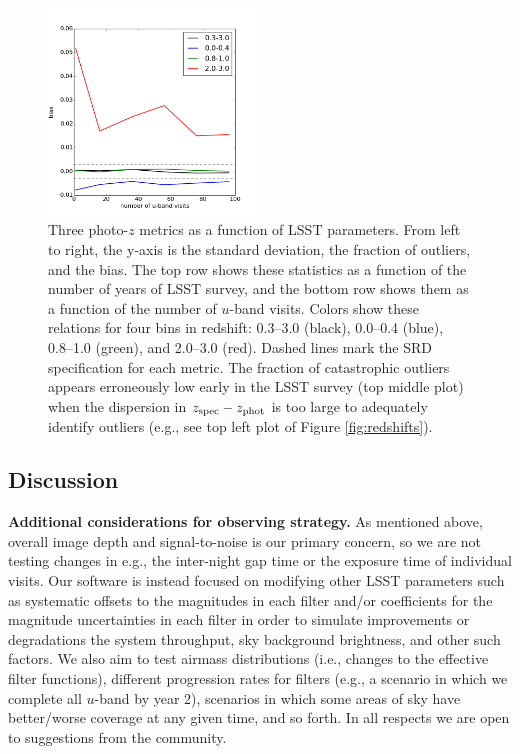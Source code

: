 \begin{figure}[h]
\begin{center}
\includegraphics[width=5.5cm]{figs/photoz/uvisits_bias.png}
\caption{Three photo-$z$ metrics as a function of LSST parameters. From
left to right, the y-axis is the standard deviation, the fraction of
outliers, and the bias. The top row shows these statistics as a function
of the number of years of LSST survey, and the bottom row shows them as
a function of the number of $u$-band visits. Colors show these relations
for four bins in redshift: 0.3--3.0 (black), 0.0--0.4 (blue), 0.8--1.0
(green), and 2.0--3.0 (red). Dashed lines mark the SRD specification for
each metric. The fraction of catastrophic outliers appears erroneously
low early in the LSST survey (top middle plot) when the dispersion in
$z_{\rm spec}-z_{\rm phot}$ is too large to adequately identify outliers
(e.g., see top left plot of Figure \ref{fig:redshifts}).
\label{fig:metrics}}
\end{center}
\end{figure}


\subsection{Discussion}

\textbf{Additional considerations for observing strategy.} As mentioned
above, overall image depth and signal-to-noise is our primary concern,
so we are not testing changes in e.g., the inter-night gap time or the
exposure time of individual visits.  Our software is instead focused on
modifying other LSST parameters such as systematic offsets to the
magnitudes in each filter and/or coefficients for the magnitude
uncertainties in each filter in order to simulate improvements or
degradations the system throughput, sky background brightness, and other
such factors. We also aim to test airmass distributions (i.e., changes
to the effective filter functions), different progression rates for
filters (e.g., a scenario in which we complete all $u$-band by year 2),
scenarios in which some areas of sky have better/worse coverage at any
given time, and so forth. In all respects we are open to suggestions
from the community.


